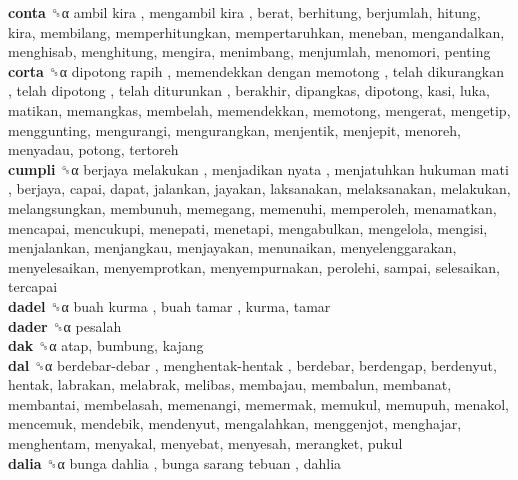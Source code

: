 \textbf{conta} ␝α   ambil kira ,  mengambil kira , berat, berhitung, berjumlah, hitung, kira, membilang, memperhitungkan, mempertaruhkan, meneban, mengandalkan, menghisab, menghitung, mengira, menimbang, menjumlah, menomori, penting  \\
\textbf{corta} ␝α   dipotong rapih ,  memendekkan dengan memotong ,  telah dikurangkan ,  telah dipotong ,  telah diturunkan , berakhir, dipangkas, dipotong, kasi, luka, matikan, memangkas, membelah, memendekkan, memotong, mengerat, mengetip, menggunting, mengurangi, mengurangkan, menjentik, menjepit, menoreh, menyadau, potong, tertoreh  \\
\textbf{cumpli} ␝α   berjaya melakukan ,  menjadikan nyata ,  menjatuhkan hukuman mati , berjaya, capai, dapat, jalankan, jayakan, laksanakan, melaksanakan, melakukan, melangsungkan, membunuh, memegang, memenuhi, memperoleh, menamatkan, mencapai, mencukupi, menepati, menetapi, mengabulkan, mengelola, mengisi, menjalankan, menjangkau, menjayakan, menunaikan, menyelenggarakan, menyelesaikan, menyemprotkan, menyempurnakan, perolehi, sampai, selesaikan, tercapai  \\
\textbf{dadel} ␝α   buah kurma ,  buah tamar , kurma, tamar  \\
\textbf{dader} ␝α  pesalah  \\
\textbf{dak} ␝α  atap, bumbung, kajang  \\
\textbf{dal} ␝α   berdebar-debar ,  menghentak-hentak , berdebar, berdengap, berdenyut, hentak, labrakan, melabrak, melibas, membajau, membalun, membanat, membantai, membelasah, memenangi, memermak, memukul, memupuh, menakol, mencemuk, mendebik, mendenyut, mengalahkan, menggenjot, menghajar, menghentam, menyakal, menyebat, menyesah, merangket, pukul  \\
\textbf{dalia} ␝α   bunga dahlia ,  bunga sarang tebuan , dahlia  \\
